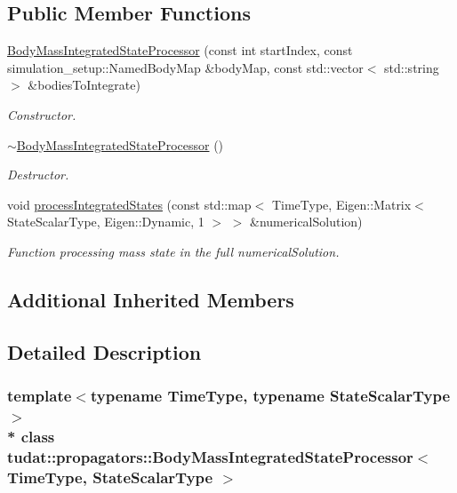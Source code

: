 \subsection*{Public Member Functions}
\begin{DoxyCompactItemize}
\item 
\hyperlink{classtudat_1_1propagators_1_1BodyMassIntegratedStateProcessor_acb9c2430a95e3b770f86ba639340f6c0}{Body\+Mass\+Integrated\+State\+Processor} (const int start\+Index, const simulation\+\_\+setup\+::\+Named\+Body\+Map \&body\+Map, const std\+::vector$<$ std\+::string $>$ \&bodies\+To\+Integrate)
\begin{DoxyCompactList}\small\item\em Constructor. \end{DoxyCompactList}\item 
\hyperlink{classtudat_1_1propagators_1_1BodyMassIntegratedStateProcessor_ad6ec2043a50970d83671e0bfb44a87da}{$\sim$\+Body\+Mass\+Integrated\+State\+Processor} ()\hypertarget{classtudat_1_1propagators_1_1BodyMassIntegratedStateProcessor_ad6ec2043a50970d83671e0bfb44a87da}{}\label{classtudat_1_1propagators_1_1BodyMassIntegratedStateProcessor_ad6ec2043a50970d83671e0bfb44a87da}

\begin{DoxyCompactList}\small\item\em Destructor. \end{DoxyCompactList}\item 
void \hyperlink{classtudat_1_1propagators_1_1BodyMassIntegratedStateProcessor_a24172315a1044a3bfe4134a194b95aec}{process\+Integrated\+States} (const std\+::map$<$ Time\+Type, Eigen\+::\+Matrix$<$ State\+Scalar\+Type, Eigen\+::\+Dynamic, 1 $>$ $>$ \&numerical\+Solution)
\begin{DoxyCompactList}\small\item\em Function processing mass state in the full numerical\+Solution. \end{DoxyCompactList}\end{DoxyCompactItemize}
\subsection*{Additional Inherited Members}


\subsection{Detailed Description}
\subsubsection*{template$<$typename Time\+Type, typename State\+Scalar\+Type$>$\\*
class tudat\+::propagators\+::\+Body\+Mass\+Integrated\+State\+Processor$<$ Time\+Type, State\+Scalar\+Type $>$}

